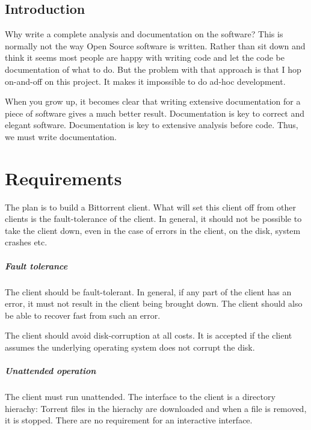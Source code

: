 \documentclass[a4paper]{report}
\begin{document}
\tableofcontents{}

\section{Introduction}
Why write a complete analysis and documentation on the software? This
is normally not the way Open Source software is written. Rather than
sit down and think it seems most people are happy with writing code
and let the code be documentation of what to do. But the problem with
that approach is that I hop on-and-off on this project. It makes it
impossible to do ad-hoc development.

When you grow up, it becomes clear that writing extensive
documentation for a piece of software gives a much better
result. Documentation is key to correct and elegant
software. Documentation is key to extensive analysis before
code. Thus, we must write documentation.

\chapter{Requirements}
\label{chap:requirements}

The plan is to build a Bittorrent client. What will set this client
off from other clients is the fault-tolerance of the client. In
general, it should not be possible to take the client down, even in
the case of errors in the client, on the disk, system crashes etc.

\paragraph{Fault tolerance} The client should be fault-tolerant. In
general, if any part of the client has an error, it must not result in
the client being brought down. The client should also be able to
recover fast from such an error.

The client should avoid disk-corruption at all costs. It is accepted
if the client assumes the underlying operating system does not corrupt
the disk.

\paragraph{Unattended operation} The client must run unattended. The
interface to the client is a directory hierachy: Torrent files in the
hierachy are downloaded and when a file is removed, it is
stopped. There are no requirement for an interactive interface.
\end{document}
